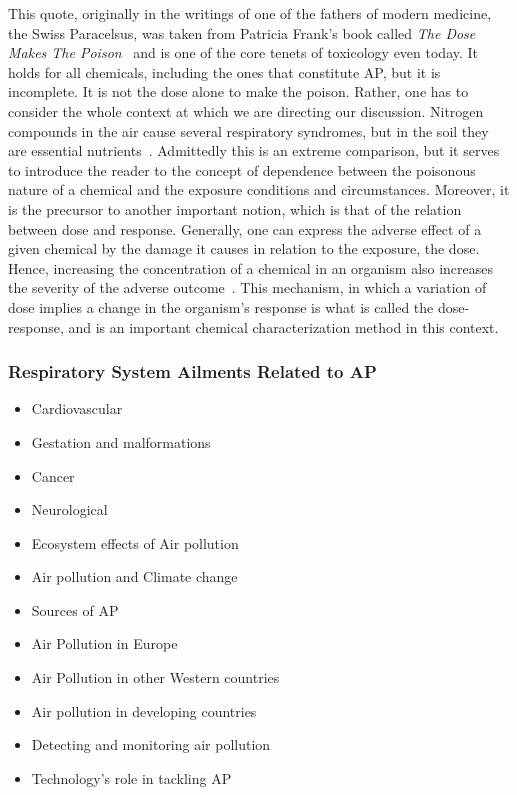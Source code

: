 This quote, originally in the writings of one of the fathers of modern
medicine, the Swiss Paracelsus, was taken from Patricia Frank's book
called \emph{The Dose Makes The Poison}~\cite{Frank2011} and is one of
the core tenets of toxicology even today. It holds for all chemicals,
including the ones that constitute \gls{AP}, but it is incomplete. It is
not the dose alone to make the poison. Rather, one has to consider the
whole context at which we are directing our discussion. Nitrogen
compounds in the air cause several respiratory syndromes, but in the
soil they are essential nutrients~\cite{Vallero2014, Lovett2009}.
Admittedly this is an extreme comparison, but it serves to introduce
the reader to the concept of dependence between the poisonous nature of
a chemical and the exposure conditions and circumstances. Moreover, it
is the precursor to another important notion, which is that of the
relation between dose and response. Generally, one can express the
adverse effect of a given chemical by the damage it causes in relation
to the exposure, the dose. Hence, increasing the concentration of a
chemical in an organism also increases the severity of the adverse
outcome~\cite{Vallero2014}. This mechanism, in which a variation of dose
implies a change in the organism's response is what is called the
dose-response, and is an important chemical characterization method in
this context.

\subsubsection{Respiratory System Ailments Related to \acrlong{AP}}%
\label{ssub:respiratory_system_ailments_related_to_ap}


\begin{itemize}
    \item Cardiovascular
    \item Gestation and malformations
    \item Cancer
    \item Neurological
\end{itemize}


\begin{itemize}
    \item Ecosystem effects of Air pollution
    \item Air pollution and Climate change
    \item Sources of AP
    \item Air Pollution in Europe
    \item Air Pollution in other Western countries
    \item Air pollution in developing countries
    \item Detecting and monitoring air pollution
    \item Technology's role in tackling AP
\end{itemize}

